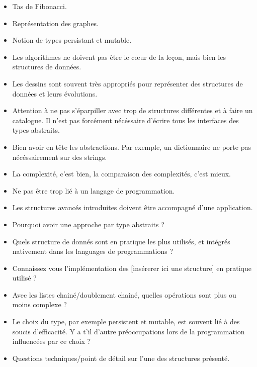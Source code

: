 \documentclass{agregfiche}
\begin{document}
\secidees

\begin{itemize}
	\item Tas de Fibonacci.
	\item Représentation des graphes.
    	\item Notion de types persistant et mutable.
\end{itemize}

\secpieges

\begin{itemize}
	\item Les algorithmes ne doivent pas être le c\oe ur de la leçon, mais bien les structures de données.
	\item Les dessins sont souvent très appropriés pour représenter des structures de données et leurs évolutions.
   	\item Attention à ne pas s'éparpiller avec trop de structures différentes et à faire un catalogue. Il n'est pas forcément nécéssaire d'écrire tous les interfaces des types abstraits.
	\item Bien avoir en tête les abstractions. Par exemple, un dictionnaire ne porte pas nécéssairement sur des strings.
	\item La complexité, c'est bien, la comparaison des complexités, c'est mieux.
	\item Ne pas être trop lié à un langage de programmation.
	\item Les structures avancés introduites doivent être accompagné d'une application.
\end{itemize}

\secquestionsclassiques

\begin{itemize}
	\item Pourquoi avoir une approche par type abstraits ?
	\item Quels structure de donnés sont en pratique les plus 
	utilisés, et intégrés nativement dans les languages de 
	programmations ?
	\item Connaissez vous l'implémentation des [insérerer ici une 
	structure] en pratique utilisé ?
	\item Avec les listes chainé/doublement chainé, quelles 
	opérations sont plus ou moins complexe ?
	\item Le choix du type, par exemple persistent et mutable, est souvent lié à des soucis d'efficacité. Y a t'il d'autre préoccupations lors de la programmation influencées par ce choix ?
    \item Questions techniques/point de détail sur l'une des structures présenté.
\end{itemize}
\end{document}
